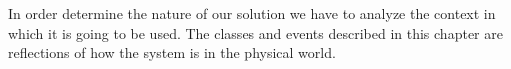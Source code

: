 In order determine the nature of our solution we have to analyze the context in which it is going to be used. The classes and events described in this chapter are reflections of how the system is in the physical world. 






